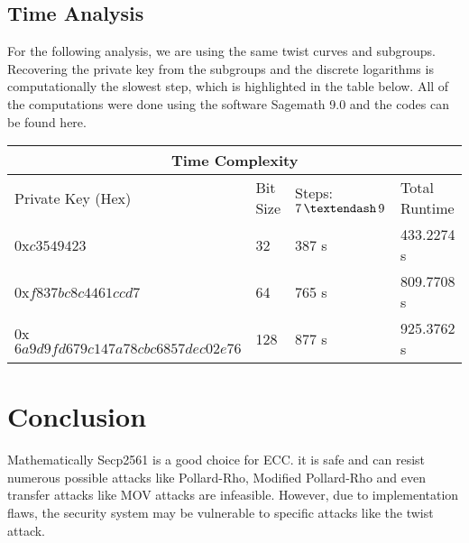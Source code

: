 \subsection{Time Analysis}
For the following analysis, we are using the same twist curves and subgroups. Recovering the private key from the subgroups and the discrete logarithms is computationally the slowest step, which is highlighted in the table below. All of the computations were done using the software Sagemath 9.0 and the codes can be found here. %
\begin{center}
\begin{tabular}{ |p{7cm}|p{2cm}||p{2.1cm}| p{3cm}|}
 \hline
 \multicolumn{4}{|c|}{Time Complexity} \\
 \hline
 Private Key (Hex) &  Bit Size & Steps: $7 \,\textendash\, 9$ & Total Runtime\\
 \hline
 $0$x$c3549423$  & 32 & 387 s & 433.2274 s\\
 $0$x$f837bc8c4461ccd7$ & 64 & 765 s & 809.7708 s\\  
 $0$x$6a9d9fd679c147a78cbc6857dec02e76$ & 128 & 877 s & 925.3762 s \\
 \hline
\end{tabular}
\end{center}

\section{Conclusion}
Mathematically Secp2561 is a good choice for ECC. it is safe and can resist numerous possible attacks like Pollard-Rho, Modified Pollard-Rho and even transfer attacks like MOV attacks are infeasible. However, due to implementation flaws, the security system may be vulnerable to specific attacks like the twist attack. 

